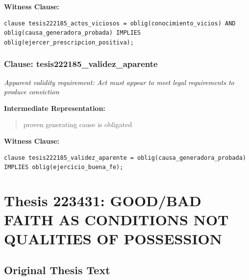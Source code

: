 \documentclass[11pt,a4paper]{article}
\begin{document}
\textbf{Witness Clause:}

\begin{lstlisting}[style=witnessstyle, language=Witness]
clause tesis222185_actos_viciosos = oblig(conocimiento_vicios) AND oblig(causa_generadora_probada) IMPLIES oblig(ejercer_prescripcion_positiva);
\end{lstlisting}

\subsubsection{Clause: tesis222185\_validez\_aparente}

\textit{Apparent validity requirement: Act must appear to meet legal requirements to produce conviction}

\textbf{Intermediate Representation:}

\begin{quote}
proven generating cause is obligated
\end{quote}

\textbf{Witness Clause:}

\begin{lstlisting}[style=witnessstyle, language=Witness]
clause tesis222185_validez_aparente = oblig(causa_generadora_probada) IMPLIES oblig(ejercicio_buena_fe);
\end{lstlisting}

\newpage

\section{Thesis 223431: GOOD/BAD FAITH AS CONDITIONS NOT QUALITIES OF POSSESSION}
\label{thesis:223431}

\subsection{Original Thesis Text}
\end{document}
